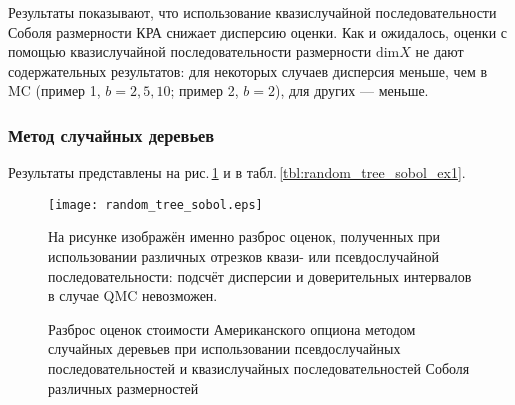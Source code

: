 Результаты показывают, что использование квазислучайной последовательности Соболя размерности КРА снижает дисперсию оценки. Как и ожидалось, оценки с помощью квазислучайной последовательности размерности $\mathrm{dim} X$ не дают содержательных результатов: для некоторых случаев дисперсия меньше, чем в MC (пример 1, $b=2,5,10$; пример 2, $b=2$), для других --- меньше.


\subsubsection{Метод случайных деревьев} %
\label{ssub:results:qmc_to_classical:sobol:random_tree}

Результаты представлены на рис.\,\ref{fig:random_tree_sobol} и в табл.\,\ref{tbl:random_tree_sobol_ex1}.%

\begin{figure}[p]
    \begin{center}
    \texttt{[image: random\_tree\_sobol.eps]}\end{center}
    \caption{Разброс оценок стоимости Американского опциона методом случайных деревьев при использовании псевдослучайных последовательностей и квазислучайных последовательностей Соболя различных размерностей}
    \label{fig:random_tree_sobol}
    \linespread{0.8}\footnotesize{На рисунке изображён именно разброс оценок, полученных при использовании различных отрезков квази- или псевдослучайной последовательности: подсчёт дисперсии и доверительных интервалов в случае QMC невозможен.}
\end{figure}

